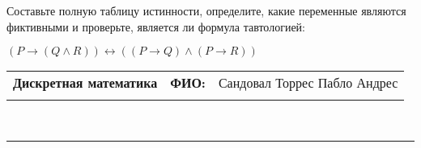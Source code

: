 \documentclass[10pt]{exam}
\newcommand{\class}{Дискретная математика}
\newcommand{\examdate}{}
\begin{document}
\begin{questions}
\begin{enumerate}[a)]
\end{enumerate}\question Составьте полную таблицу истинности, определите, какие переменные являются фиктивными и проверьте, является ли формула тавтологией:

$(P \rightarrow (Q \land R)) \leftrightarrow ((P \rightarrow Q) \land (P \rightarrow R))$

\end{questions}
\newpage
\begin{flushright}
\begin{tabular}{p{2.8in} r l}
\textbf{\class} & \textbf{ФИО:} &Сандовал Торрес Пабло Андрес
\\

\textbf{\examdate} &&\\
\end{tabular}\\
\end{flushright}
\rule[1ex]{\textwidth}{.1pt}
\end{document}
